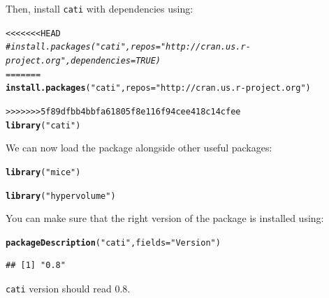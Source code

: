 \documentclass[12pt]{article}\usepackage[]{graphicx}\usepackage[]{color}
\makeatletter
\newcommand{\hlstr}[1]{\textcolor[rgb]{0.192,0.494,0.8}{#1}}%
\newcommand{\hlcom}[1]{\textcolor[rgb]{0.678,0.584,0.686}{\textit{#1}}}%
\newcommand{\hlstd}[1]{\textcolor[rgb]{0.345,0.345,0.345}{#1}}%
\newcommand{\hlkwc}[1]{\textcolor[rgb]{0.333,0.667,0.333}{#1}}%
\newcommand{\hlkwd}[1]{\textcolor[rgb]{0.737,0.353,0.396}{\textbf{#1}}}%
\newenvironment{kframe}{%
 \def\at@end@of@kframe{}%
 \ifinner\ifhmode%
  \def\at@end@of@kframe{\end{minipage}}%
  \begin{minipage}{\columnwidth}%
 \fi\fi%
 \def\FrameCommand##1{\hskip\@totalleftmargin \hskip-\fboxsep
 \colorbox{shadecolor}{##1}\hskip-\fboxsep
     \hskip-\linewidth \hskip-\@totalleftmargin \hskip\columnwidth}%
 \MakeFramed {\advance\hsize-\width
   \@totalleftmargin\z@ \linewidth\hsize
   \@setminipage}}%
 {\par\unskip\endMakeFramed%
 \at@end@of@kframe}
\newenvironment{knitrout}{}{} %
\makeatother
\begin{document}
Then, install \texttt{cati} with dependencies using:
\begin{knitrout}
\color{fgcolor}\begin{kframe}
\begin{alltt}
<<<<<<< HEAD
\hlcom{#install.packages("cati", repos = "http://cran.us.r-project.org", dependencies = TRUE)}
=======
\hlkwd{install.packages}\hlstd{(}\hlstr{"cati"}\hlstd{,} \hlkwc{repos} \hlstd{=} \hlstr{"http://cran.us.r-project.org"}\hlstd{)}
\end{alltt}


{\ttfamily\noindent\itshape\color{messagecolor}{\#\# Installing package into 'C:/Users/taudiere/Documents/R/win-library/3.1'\\\#\# (as 'lib' is unspecified)}}\begin{alltt}
>>>>>>> 5f89dfbb4bbfa61805f8e116f94cee418c14cfee
\hlkwd{library}\hlstd{(}\hlstr{"cati"}\hlstd{)}
\end{alltt}


{\ttfamily\noindent\itshape\color{messagecolor}{\#\# Loading required package: nlme\\\#\# Loading required package: ade4\\\#\# Loading required package: ape}}\end{kframe}
\end{knitrout}

We can now load the package alongside other useful packages:
\begin{knitrout}
\color{fgcolor}\begin{kframe}
\begin{alltt}
\hlkwd{library}\hlstd{(}\hlstr{"mice"}\hlstd{)}
\end{alltt}


{\ttfamily\noindent\itshape\color{messagecolor}{\#\# Loading required package: Rcpp\\\#\# Loading required package: lattice\\\#\# mice 2.22 2014-06-10}}\begin{alltt}
\hlkwd{library}\hlstd{(}\hlstr{"hypervolume"}\hlstd{)}
\end{alltt}


{\ttfamily\noindent\itshape\color{messagecolor}{\#\# Loading required package: rgl}}\end{kframe}
\end{knitrout}

\noindent You can make sure that the right version of the package is installed using:
\begin{knitrout}
\color{fgcolor}\begin{kframe}
\begin{alltt}
\hlkwd{packageDescription}\hlstd{(}\hlstr{"cati"}\hlstd{,} \hlkwc{fields} \hlstd{=} \hlstr{"Version"}\hlstd{)}
\end{alltt}
\begin{verbatim}
## [1] "0.8"
\end{verbatim}
\end{kframe}
\end{knitrout}
\texttt{cati} version should read 0.8.
\end{document}
